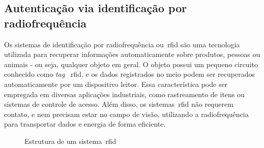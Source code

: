 \subsection{Autenticação via identificação por radiofrequência}
\label{subsec:autenticacao-identificacao-radiofrequencia}

Os sistemas de identificação por radiofrequência ou~\acrfull{rfid} são uma
tecnologia
utilizada para recuperar informações automaticamente sobre produtos, pessoas ou
animais - ou seja, qualquer objeto em geral.
O objeto possui um pequeno circuito conhecido como \textit{tag}~\acrshort{
    rfid}, e os
dados registrados no meio podem ser recuperados automaticamente por um
dispositivo leitor.
Essa característica pode ser empregada em diversas aplicações industriais,
como rastreamento de itens ou sistemas de controle de acesso.
Além disso, os sistemas~\acrshort{rfid} não requerem contato, e nem precisam
estar
no campo de visão, utilizando a radiofrequência para transportar dados e energia
de forma eficiente\cite{feldhofer2004}.

\begin{figure}[h!]
    \caption[Estrutura de um sistema~\acrshort{rfid}]
    {Estrutura de um sistema~\acrshort{rfid}}
    \label{fig:estrutura-sistema-rfid}
\end{figure}

